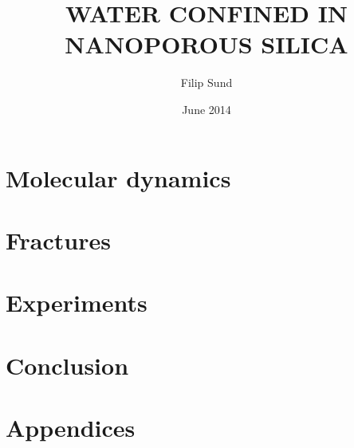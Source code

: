 \documentclass[twoside,english,a4paper,12pt]{uiofysmaster}
\author{Filip Sund}
\title{\uppercase{Water confined in\\ nanoporous silica}}
\date{June 2014}
\begin{document}

\cleardoublepage





\tableofcontents

\listoffigures
\listoftables
\listoflistings



\part{Molecular dynamics}
    
%     
    
    
    
    

\part{Fractures}
    
    
    
    
    

\part{Experiments}
    
    
    
    
    

\part{Conclusion}
    
    

\part{Appendices}
\begin{appendix}
    
    
\end{appendix}

\printbibliography

\listoftodos
\end{document}
